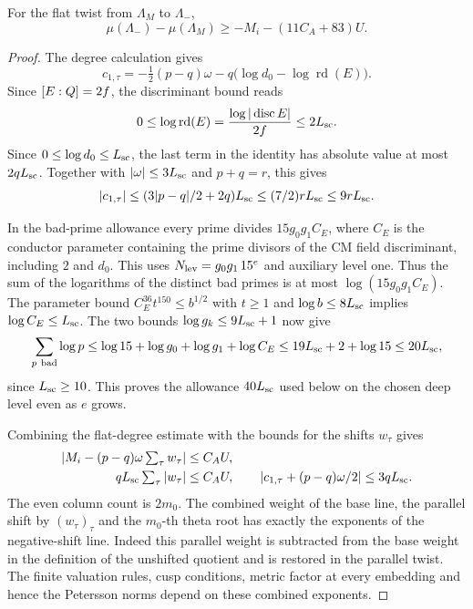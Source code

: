 \begin{lemma}
For the flat twist from \(\Lambda_M\) to \(\Lambda_-\),
\[
 \mu(\Lambda_-)-\mu(\Lambda_M)\ge-M_i-(11C_A+83)U .
\]
\end{lemma}
\begin{proof}
The degree calculation gives
\[
 c_{1,\tau}=-\tfrac12(p-q)\omega
           -q\bigl(\log d_0-\log\operatorname{rd}(E)\bigr).
\]
Since \([E:Q]=2f\), the discriminant bound reads
\[
       0\le \log\operatorname{rd}(E)
       =\frac{\log|\operatorname{disc}E|}{2f}\le2L_{\rm sc}.
\]
Since \(0\le\log d_0\le L_{\rm sc}\), the last term in the
identity has absolute value at most \(2qL_{\rm sc}\).
Together with \(|\omega|\le3L_{\rm sc}\) and \(p+q=r\), this gives
\[
 |c_{1,\tau}|\le(3|p-q|/2+2q)L_{\rm sc}
          \le(7/2)rL_{\rm sc}\le9rL_{\rm sc}.
\]
\label{cor:covolume-component-transfer-10}

In the bad-prime allowance every prime divides
\(15g_0g_1 C_E\), where \(C_E\) is the conductor
parameter containing the prime divisors of the CM field discriminant, including \(2\) and \(d_0\).
This uses \(N_{\rm lev}=g_0g_1\,15^e\) and auxiliary level one.
Thus the sum of the logarithms of the distinct bad primes
is at most \(\log(15g_0g_1 C_E)\). The parameter bound
\(C_E^{36}t^{150}\le b^{1/2}\) with \(t\ge1\) and
\(\log b\le8L_{\rm sc}\) implies \(\log C_E\le L_{\rm sc}\).
The two bounds \(\log g_k\le9L_{\rm sc}+1\) now give
\[
 \sum_{p\ {\rm bad}}\log p
 \le\log 15+\log g_0+\log g_1+\log C_E
 \le 19 L_{\rm sc}+2+\log 15\le20L_{\rm sc},
\]
since \(L_{\rm sc}\ge10\). This proves the allowance \(40L_{\rm sc}\)
used below on the chosen deep level even as \(e\) grows.
\label{cor:covolume-component-transfer-11}

Combining the flat-degree estimate with the bounds for the shifts \(w_\tau\) gives
\[
 \begin{split}
 |M_i-(p-q)\omega\textstyle\sum_\tau w_\tau|&\le C_A U,\\
 q L_{\rm sc}\textstyle\sum_\tau|w_\tau|&\le C_A U,\qquad
 |c_{1,\tau}+(p-q)\omega/2|\le3qL_{\rm sc}.
 \end{split}
\]
The even column count is \(2m_0\). The combined weight of
the base line, the parallel shift by \((w_\tau)_\tau\) and the
\(m_0\)-th theta root has exactly the exponents of the
negative-shift line. Indeed this parallel weight is subtracted from the
base weight in the definition of the unshifted quotient and
is restored in the parallel twist. The finite valuation rules,
cusp conditions, metric factor at every embedding and hence
the Petersson norms depend on these combined exponents.


\end{proof}
